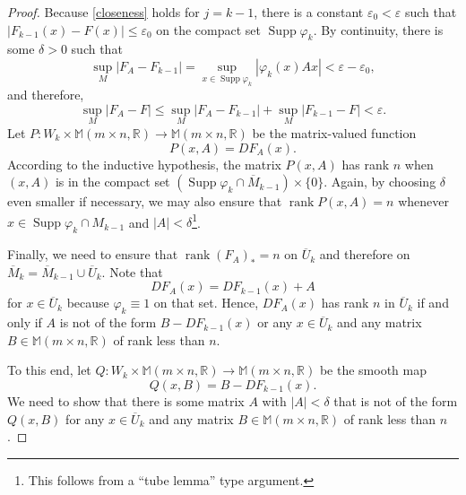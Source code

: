 \documentclass[11pt]{article}
\theoremstyle{thmstyle}
\theoremstyle{defstyle}
\newcommand{\R}{\mathbb{R}}
\newcommand{\Supp}{\operatorname{Supp}}
\renewcommand{\le}{\leqslant}
\newcommand{\rank}{\operatorname{rank}}
\begin{document}
\begin{proof}
	Because \ref{closeness} holds for $j = k - 1$, there is a constant $\varepsilon_0 < \varepsilon$ such that $|F_{k - 1}(x) - F(x)|\le\varepsilon_0$ on the compact set $\Supp\varphi_k$. By continuity, there is some $\delta > 0$ such that 
	\begin{equation*}
		\sup_M|F_A - F_{k - 1}| = \sup_{x\in\Supp\varphi_k}\left|\varphi_k(x)Ax\right| < \varepsilon - \varepsilon_0,
	\end{equation*}
	and therefore, 
	\begin{equation*}
		\sup_M|F_A - F|\le\sup_M |F_A - F_{k - 1}| + \sup_{M} |F_{k - 1} - F| < \varepsilon.
	\end{equation*}
	Let $P\colon W_k\times\mathbb{M}(m\times n, \R)\to\mathbb M(m\times n, \R)$ be the matrix-valued function 
	\begin{equation*}
		P(x, A) = DF_A(x).
	\end{equation*}
	According to the inductive hypothesis, the matrix $P(x, A)$ has rank $n$ when $(x, A)$ is in the compact set $\left(\Supp\varphi_k\cap\overline M_{k - 1}\right)\times\{0\}$. Again, by choosing $\delta$ even smaller if necessary, we may also ensure that $\rank P(x, A) = n$ whenever $x\in\Supp\varphi_k\cap M_{k - 1}$ and $|A| < \delta$\footnote{This follows from a ``tube lemma'' type argument.}.

	Finally, we need to ensure that $\rank(F_A)_\ast = n$ on $\overline U_k$ and therefore on $\overline M_k = \overline{M}_{k - 1}\cup\overline U_k$. Note that 
	\begin{equation*}
		DF_A(x) = DF_{k - 1}(x) + A
	\end{equation*}
	for $x\in\overline U_k$ because $\varphi_k\equiv 1$ on that set. Hence, $DF_A(x)$ has rank $n$ in $\overline U_k$ if and only if $A$ is not of the form $B - DF_{k - 1}(x)$ or any $x\in\overline U_k$ and any matrix $B\in\mathbb M(m\times n, \R)$ of rank less than $n$. 

	To this end, let $Q\colon W_k\times\mathbb M(m\times n,\R)\to\mathbb M(m\times n, \R)$ be the smooth map 
	\begin{equation*}
		Q(x, B) = B - DF_{k - 1}(x).
	\end{equation*}
	We need to show that there is some matrix $A$ with $|A| < \delta$ that is not of the form $Q(x, B)$ for any $x\in\overline U_k$ and any matrix $B\in\mathbb M(m\times n, \R)$ of rank less than $n$.


\end{proof}
\end{document}
